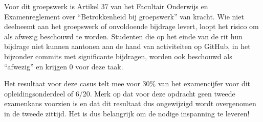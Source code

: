 \documentclass[fleqn,10pt]{voorstel}
\begin{document}
Voor dit groepswerk is Artikel 37 van het Facultair Onderwijs en Examenreglement over ``Betrokkenheid bij groepswerk'' van kracht. Wie niet deelneemt aan het groepswerk of onvoldoende bijdrage levert, loopt het risico om als afwezig beschouwd te worden. Studenten die op het einde van de rit hun bijdrage niet kunnen aantonen aan de hand van activiteiten op GitHub, in het bijzonder commits met significante bijdragen, worden ook beschouwd als ``afwezig'' en krijgen 0 voor deze taak.

Het resultaat voor deze casus telt mee voor 30\% van het examencijfer voor dit opleidingsonderdeel of 6/20. Merk op dat voor deze opdracht geen tweede examenkans voorzien is en dat dit resultaat dus ongewijzigd wordt overgenomen in de tweede zittijd. Het is dus belangrijk om de nodige inspanning te leveren!


\printbibliography[heading=bibintoc]
\end{document}
